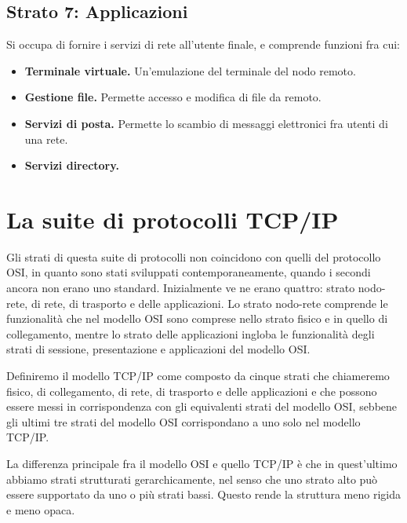     \subsection{Strato 7: Applicazioni}
        Si occupa di fornire i servizi di rete all'utente finale, e comprende funzioni fra cui:
        \begin{itemize}
            \item \textbf{Terminale virtuale.} Un'emulazione del terminale del nodo remoto.
            
            \item \textbf{Gestione file.} Permette accesso e modifica di file da remoto.
            
            \item \textbf{Servizi di posta.} Permette lo scambio di messaggi elettronici fra utenti di una rete.
            
            \item \textbf{Servizi directory.}
        \end{itemize}
        
\section{La suite di protocolli TCP/IP}
    Gli strati di questa suite di protocolli non coincidono con quelli del protocollo OSI, in quanto sono stati sviluppati contemporaneamente, quando i secondi ancora non erano uno standard. Inizialmente ve ne erano quattro: strato nodo-rete, di rete, di trasporto e delle applicazioni. Lo strato nodo-rete comprende le funzionalità che nel modello OSI sono comprese nello strato fisico e in quello di collegamento, mentre lo strato delle applicazioni ingloba le funzionalità degli strati di sessione, presentazione e applicazioni del modello OSI.
    
    Definiremo il modello TCP/IP come composto da cinque strati che chiameremo fisico, di collegamento, di rete, di trasporto e delle applicazioni e che possono essere messi in corrispondenza con gli equivalenti strati del modello OSI, sebbene gli ultimi tre strati del modello OSI corrispondano a uno solo nel modello TCP/IP.
    
    La differenza principale fra il modello OSI e quello TCP/IP è che in quest'ultimo abbiamo strati strutturati gerarchicamente, nel senso che uno strato alto può essere supportato da uno o più strati bassi. Questo rende la struttura meno rigida e meno opaca.
    
